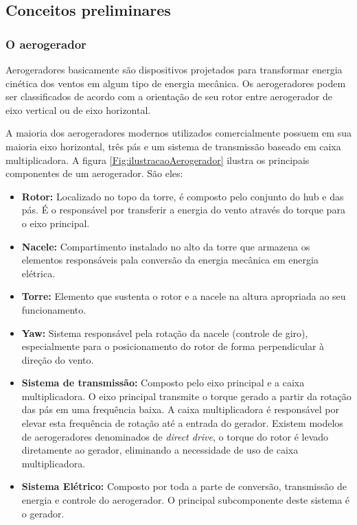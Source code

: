 
\subsection{Conceitos preliminares}
\label{Sec:conceitosPreliminares}

\subsubsection{O aerogerador}
\label{Sec:oAerogerador}

Aerogeradores basicamente são dispositivos projetados para transformar energia cinética dos ventos em algum tipo de energia mecânica. Os aerogeradores podem ser classificados de acordo com a orientação de seu rotor entre aerogerador de eixo vertical ou de eixo horizontal.

A maioria dos aerogeradores modernos utilizados comercialmente possuem em sua maioria eixo horizontal, três pás e um sistema de transmissão baseado em caixa multiplicadora. A figura \ref{Fig:ilustracaoAerogerador} ilustra os principais componentes de um aerogerador. São eles:

\begin{itemize}
    \item \textbf{Rotor:} Localizado no topo da torre, é composto pelo conjunto do hub e das pás. É o responsável por transferir a energia do vento através do torque para o eixo principal.
    \item \textbf{Nacele:} Compartimento instalado no alto da torre que armazena os elementos responsáveis pala conversão da energia mecânica em energia elétrica.
    \item \textbf{Torre:} Elemento que sustenta o rotor e a nacele na altura apropriada ao seu funcionamento.
    \item \textbf{Yaw:} Sistema responsável pela rotação da nacele (controle de giro), especialmente para o posicionamento do rotor de forma perpendicular à direção do vento.
    \item \textbf{Sistema de transmissão:} Composto pelo eixo principal e a caixa multiplicadora. O eixo principal transmite o torque gerado a partir da rotação das pás em uma frequência baixa. A caixa multiplicadora é responsável por elevar esta frequência de rotação até a entrada do gerador. Existem modelos de aerogeradores denominados de \textit{direct drive}, o torque do rotor é levado diretamente ao gerador, eliminando a necessidade de uso de caixa multiplicadora.
    \item \textbf{Sistema Elétrico:} Composto por toda a parte de conversão, transmissão de energia e controle do aerogerador. O principal subcomponente deste sistema é o gerador.
\end{itemize}

